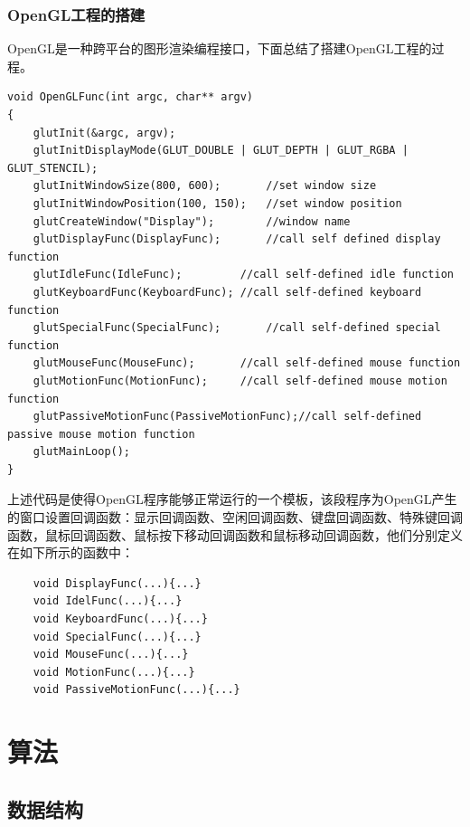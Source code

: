 \documentclass[10pt]{article}
\begin{document}
\subsubsection{OpenGL工程的搭建}
OpenGL是一种跨平台的图形渲染编程接口，下面总结了搭建OpenGL工程的过程。
\begin{lstlisting}
void OpenGLFunc(int argc, char** argv)
{
	glutInit(&argc, argv);
	glutInitDisplayMode(GLUT_DOUBLE | GLUT_DEPTH | GLUT_RGBA | GLUT_STENCIL);
	glutInitWindowSize(800, 600);		//set window size
	glutInitWindowPosition(100, 150);	//set window position
	glutCreateWindow("Display");		//window name
	glutDisplayFunc(DisplayFunc);		//call self defined display function
	glutIdleFunc(IdleFunc);			//call self-defined idle function
	glutKeyboardFunc(KeyboardFunc);	//call self-defined keyboard function
	glutSpecialFunc(SpecialFunc);		//call self-defined special function
	glutMouseFunc(MouseFunc);		//call self-defined mouse function
	glutMotionFunc(MotionFunc);		//call self-defined mouse motion function
	glutPassiveMotionFunc(PassiveMotionFunc);//call self-defined passive mouse motion function
	glutMainLoop();
}
\end{lstlisting}

上述代码是使得OpenGL程序能够正常运行的一个模板，该段程序为OpenGL产生的窗口设置回调函数：显示回调函数、空闲回调函数、键盘回调函数、特殊键回调函数，鼠标回调函数、鼠标按下移动回调函数和鼠标移动回调函数，他们分别定义在如下所示的函数中：
\begin{lstlisting}
	void DisplayFunc(...){...}
	void IdelFunc(...){...}
	void KeyboardFunc(...){...}
	void SpecialFunc(...){...}
	void MouseFunc(...){...}
	void MotionFunc(...){...}
	void PassiveMotionFunc(...){...}
\end{lstlisting}


\section{算法}
\subsection{数据结构}
\end{document}
